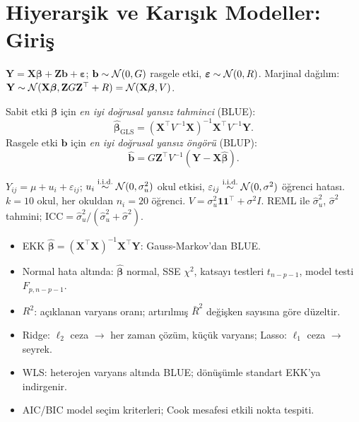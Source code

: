 \section{Hiyerarşik ve Karışık Modeller: Giriş}
\label{sec:hiyerarsik_model}

\begin{tanim}\label{def:karisik_model}
$\mathbf{Y}=\mathbf{X}\boldsymbol\beta+\mathbf{Z}\mathbf{b}+\boldsymbol\varepsilon$; $\mathbf{b}\sim\mathcal{N}(0,G)$ rasgele etki, $\boldsymbol\varepsilon\sim\mathcal{N}(0,R)$. Marjinal dağılım: $\mathbf{Y}\sim\mathcal{N}(\mathbf{X}\boldsymbol\beta,\mathbf{Z}G\mathbf{Z}^\top+R)=\mathcal{N}(\mathbf{X}\boldsymbol\beta,V)$.
\end{tanim}

\begin{teorem}\label{thm:blup}
Sabit etki $\boldsymbol\beta$ için \emph{en iyi doğrusal yansız tahminci} (BLUE):
\[
  \hat{\boldsymbol\beta}_{\mathrm{GLS}} = (\mathbf{X}^\top V^{-1}\mathbf{X})^{-1}\mathbf{X}^\top V^{-1}\mathbf{Y}.
\]
Rasgele etki $\mathbf{b}$ için \emph{en iyi doğrusal yansız öngörü} (BLUP):
\[
  \hat{\mathbf{b}} = G\mathbf{Z}^\top V^{-1}(\mathbf{Y}-\mathbf{X}\hat{\boldsymbol\beta}).
\]
\end{teorem}

\begin{ornek}
$Y_{ij}=\mu+u_i+\varepsilon_{ij}$; $u_i\overset{\text{i.i.d.}}{\sim}\mathcal{N}(0,\sigma_u^2)$ okul etkisi, $\varepsilon_{ij}\overset{\text{i.i.d.}}{\sim}\mathcal{N}(0,\sigma^2)$ öğrenci hatası. $k=10$ okul, her okuldan $n_i=20$ öğrenci. $V=\sigma_u^2\mathbf{1}\mathbf{1}^\top+\sigma^2 I$. REML ile $\hat\sigma_u^2$, $\hat\sigma^2$ tahmini; ICC$=\hat\sigma_u^2/(\hat\sigma_u^2+\hat\sigma^2)$.
\end{ornek}


\begin{mikroozet}
\begin{itemize}
  \item EKK $\hat{\boldsymbol\beta}=(\mathbf{X}^\top\mathbf{X})^{-1}\mathbf{X}^\top\mathbf{Y}$: Gauss-Markov'dan BLUE.
  \item Normal hata altında: $\hat{\boldsymbol\beta}$ normal, SSE $\chi^2$, katsayı testleri $t_{n-p-1}$, model testi $F_{p,n-p-1}$.
  \item $R^2$: açıklanan varyans oranı; artırılmış $\bar{R}^2$ değişken sayısına göre düzeltir.
  \item Ridge: $\ell_2$ ceza $\to$ her zaman çözüm, küçük varyans; Lasso: $\ell_1$ ceza $\to$ seyrek.
  \item WLS: heterojen varyans altında BLUE; dönüşümle standart EKK'ya indirgenir.
  \item AIC/BIC model seçim kriterleri; Cook mesafesi etkili nokta tespiti.
\end{itemize}
\end{mikroozet}

